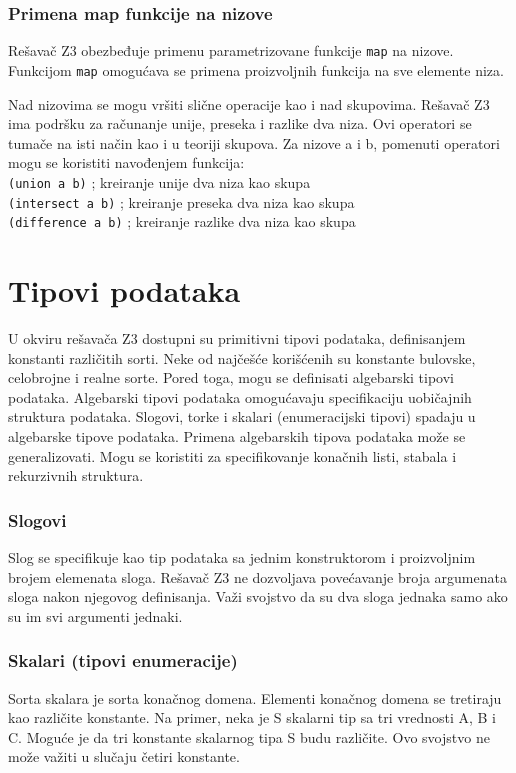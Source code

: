 \documentclass[12pt,oneside]{memoir}
\begin{document}
\subsubsection{Primena map funkcije na nizove}
Rešavač Z3 obezbeđuje primenu parametrizovane funkcije \texttt{map} na nizove. Funkcijom \texttt{map} omogućava se primena proizvoljnih funkcija na sve elemente niza.

Nad nizovima se mogu vršiti slične operacije kao i nad skupovima. Rešavač Z3 ima podršku za računanje unije, preseka i razlike dva niza. Ovi operatori se tumače na isti način kao i u teoriji skupova. Za nizove a i b, pomenuti operatori mogu se koristiti navođenjem funkcija:\\
\texttt{(union a b)} ; kreiranje unije dva niza kao skupa \\
\texttt{(intersect a b)} ; kreiranje preseka dva niza kao skupa \\
\texttt{(difference a b)} ; kreiranje razlike dva niza kao skupa

\section{Tipovi podataka} \label{sec:num3}
U okviru rešavača Z3 dostupni su primitivni tipovi podataka, definisanjem konstanti različitih sorti. Neke od najčešće korišćenih su konstante bulovske, celobrojne i realne sorte.
Pored toga, mogu se definisati algebarski tipovi podataka. Algebarski tipovi podataka omogućavaju specifikaciju uobičajnih struktura podataka. Slogovi, torke i skalari (enumeracijski tipovi) spadaju u algebarske tipove podataka. Primena algebarskih tipova podataka može se generalizovati. Mogu se koristiti za specifikovanje konačnih listi, stabala i rekurzivnih struktura. 
\subsubsection{Slogovi}
Slog se specifikuje kao tip podataka sa jednim konstruktorom i proizvoljnim brojem elemenata sloga. Rešavač Z3 ne dozvoljava povećavanje broja argumenata sloga nakon njegovog definisanja. Važi svojstvo da su dva sloga jednaka samo ako su im svi argumenti jednaki.
\subsubsection{Skalari (tipovi enumeracije)}

Sorta skalara je sorta konačnog domena. Elementi konačnog domena se tretiraju kao različite konstante. Na primer, neka je S skalarni tip sa tri vrednosti A, B i C. Moguće je da tri konstante skalarnog tipa S budu različite. Ovo svojstvo ne može važiti u slučaju četiri konstante.
\end{document}
